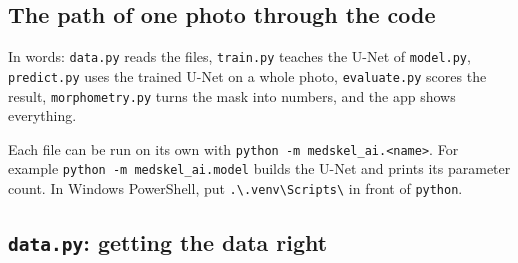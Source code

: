 \subsection{The path of one photo through the code}
\begin{center}
\end{center}
In words: \texttt{data.py} reads the files, \texttt{train.py} teaches the U-Net of \texttt{model.py}, \texttt{predict.py} uses the trained U-Net on a whole photo, \texttt{evaluate.py} scores the result, \texttt{morphometry.py} turns the mask into numbers, and the app shows everything.

\begin{remember}
Each file can be run on its own with \texttt{python -m medskel\_ai.<name>}. For example \texttt{python -m medskel\_ai.model} builds the U-Net and prints its parameter count. In Windows PowerShell, put \texttt{.\textbackslash.venv\textbackslash Scripts\textbackslash} in front of \texttt{python}.
\end{remember}

\subsection{\texttt{data.py}: getting the data right}

